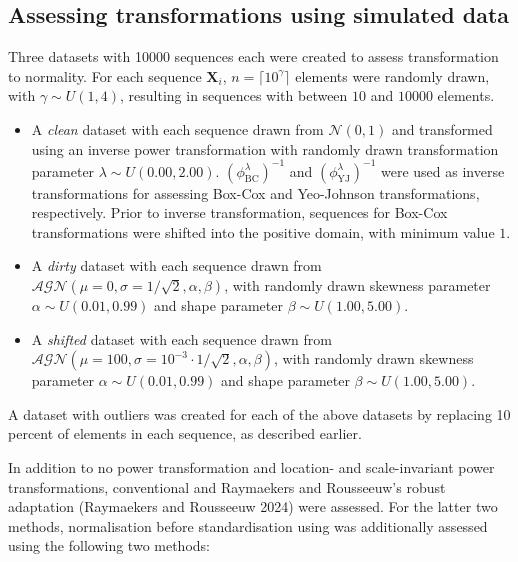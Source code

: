 \documentclass[
  a4paper,
]{article}
\begin{document}
\subsection{Assessing transformations using simulated
data}\label{assessing-transformations-using-simulated-data}

Three datasets with 10000 sequences each were created to assess
transformation to normality. For each sequence \(\mathbf{X}_i\),
\(n = \lceil 10^\gamma \rceil\) elements were randomly drawn, with
\(\gamma \sim U\left(1, 4\right)\), resulting in sequences with between
\(10\) and \(10000\) elements.

\begin{itemize}
\item
  A \textit{clean} dataset with each sequence drawn from
  \(\mathcal{N}(0, 1)\) and transformed using an inverse power
  transformation with randomly drawn transformation parameter
  \(\lambda \sim U\left(0.00, 2.00 \right)\).
  \(\left(\phi_{\text{BC}}^\lambda\right)^{-1}\) and
  \(\left(\phi_{\text{YJ}}^\lambda\right)^{-1}\) were used as inverse
  transformations for assessing Box-Cox and Yeo-Johnson transformations,
  respectively. Prior to inverse transformation, sequences for Box-Cox
  transformations were shifted into the positive domain, with minimum
  value \(1\).
\item
  A \textit{dirty} dataset with each sequence drawn from
  \(\mathcal{AGN}\left(\mu = 0, \sigma = 1/\sqrt{2}, \alpha, \beta \right)\),
  with randomly drawn skewness parameter
  \(\alpha \sim U\left(0.01, 0.99\right)\) and shape parameter
  \(\beta \sim U\left(1.00, 5.00 \right)\).
\item
  A \textit{shifted} dataset with each sequence drawn from
  \(\mathcal{AGN}\left(\mu = 100, \sigma = 10^{-3} \cdot 1/\sqrt{2} , \alpha, \beta \right)\),
  with randomly drawn skewness parameter
  \(\alpha \sim U\left(0.01, 0.99\right)\) and shape parameter
  \(\beta \sim U\left(1.00, 5.00 \right)\).
\end{itemize}

A dataset with outliers was created for each of the above datasets by
replacing 10 percent of elements in each sequence, as described earlier.

In addition to no power transformation and location- and scale-invariant
power transformations, conventional and Raymaekers and Rousseeuw's
robust adaptation (Raymaekers and Rousseeuw 2024) were assessed. For the
latter two methods, normalisation before standardisation using was
additionally assessed using the following two methods:
\end{document}

